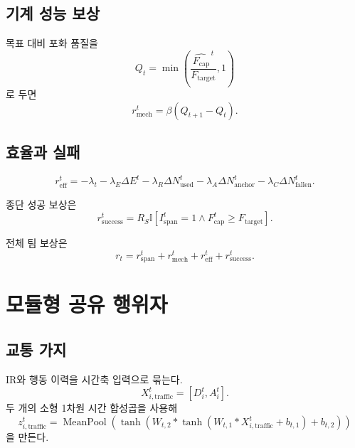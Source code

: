 \documentclass[11pt,a4paper]{article}
\newcommand{\I}{\mathbb{I}}
\newcommand{\Ftarget}{F_{\mathrm{target}}}
\newcommand{\Fcap}{F_{\mathrm{cap}}}
\newcommand{\Ispan}{I_{\mathrm{span}}}
\begin{document}
\subsection{기계 성능 보상}

목표 대비 포화 품질을
\begin{equation}
  Q_t=
  \min\left(
    \frac{\widehat{\Fcap}^{\,t}}{\Ftarget},
    1
  \right)
\end{equation}
로 두면
\begin{equation}
  r_{\mathrm{mech}}^t=
  \beta(Q_{t+1}-Q_t).
  \label{eq:mechanical-reward}
\end{equation}

\subsection{효율과 실패}

\begin{equation}
  r_{\mathrm{eff}}^t=
  -\lambda_t
  -\lambda_E\Delta E^t
  -\lambda_R\Delta N_{\mathrm{used}}^t
  -\lambda_A\Delta N_{\mathrm{anchor}}^t
  -\lambda_C\Delta N_{\mathrm{fallen}}^t.
  \label{eq:efficiency-reward}
\end{equation}

종단 성공 보상은
\begin{equation}
  r_{\mathrm{success}}^t=
  R_S
  \I\!\left[
    \Ispan^t=1
    \land
    \Fcap^t\ge\Ftarget
  \right].
  \label{eq:success-reward}
\end{equation}

전체 팀 보상은
\begin{equation}
  r_t=
  r_{\mathrm{span}}^t+
  r_{\mathrm{mech}}^t+
  r_{\mathrm{eff}}^t+
  r_{\mathrm{success}}^t.
  \label{eq:team-reward}
\end{equation}

\section{모듈형 공유 행위자}

\subsection{교통 가지}

IR와 행동 이력을 시간축 입력으로 묶는다.
\begin{equation}
  X_{i,\mathrm{traffic}}^t
  =
  [D_i^t,A_i^t].
\end{equation}
두 개의 소형 1차원 시간 합성곱을 사용해
\begin{equation}
  z_{i,\mathrm{traffic}}^t
  =
  \operatorname{MeanPool}
  \left(
    \tanh\left(
      W_{t,2}*
      \tanh(W_{t,1}*X_{i,\mathrm{traffic}}^t+b_{t,1})
      +b_{t,2}
    \right)
  \right)
  \label{eq:traffic-encoder}
\end{equation}
을 만든다.
\end{document}
